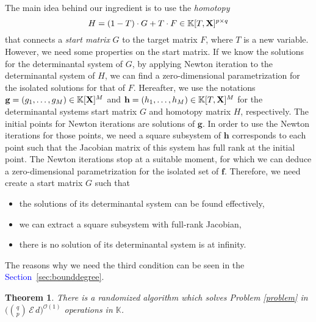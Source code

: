 \documentclass[11pt]{article}
\numberwithin{Property}{section}
\newtheorem{Theorem}{Theorem}%
\numberwithin{Theorem}{section}
\numberwithin{Proposition}{section}
\numberwithin{Lemma}{section}
\numberwithin{Corollary}{section}
\numberwithin{Definition}{section}
\numberwithin{Remark}{section}
\numberwithin{Conjecture}{section}
\numberwithin{Problem}{section}
\numberwithin{Claim}{section}
\theoremstyle{definition}
\numberwithin{Example}{section}
\def\f {\ensuremath{\mathbf{f}}}
\def\h {\ensuremath{\mathbf{h}}}
\def\g {\ensuremath{\mathbf{g}}}
\newcommand{\bigO}[1]{\mathcal{O}(#1)} %
\newcommand{\field}{\mathbb{K}} %
\newcommand{\mat}[1]{\mathbf{\MakeUppercase{#1}}} %
\newcommand{\improve}[1]{\textcolor{blue}{#1}} %
\begin{document}
The main idea behind our ingredient is to use the \emph{homotopy} 
\[H = (1-T)\cdot G + T\cdot F \in \field[T, \mat{X}]^{p \times q}\]
that connects a \emph{start matrix} $G$ to the target matrix $F$, where $T$ is a new variable. However, we need some properties on the start matrix. If we know the solutions for the determinantal system of $G$, by applying Newton iteration to the determinantal system of $H$, we can find a zero-dimensional parametrization for the isolated solutions for that of $F$. Hereafter, we use the notations $\g = (g_1, \ldots, g_M) \in \field[\mat{X}]^M$ and $\h = (h_1, \ldots, h_M) \in \field[T,\mat{X}]^M$ for the determinantal systems start matrix $G$ and homotopy matrix $H$, respectively. The initial points for Newton iterations are solutions of $\g$. In order to use the Newton iterations for those points, we need a square subsystem of $\h$ corresponds to each point such that the Jacobian matrix of this system has full rank at the initial point. The Newton iterations stop at a suitable moment, for which we can deduce a zero-dimensional parametrization for the isolated set of $\f$.  Therefore, we need create a start matrix $G$ such that
\begin{itemize}
\item the solutions of its determinantal system can be found effectively,
\item we can extract a square subsystem with full-rank Jacobian,
\item there is no solution of its determinantal system is at infinity.
\end{itemize}
The reasons why we need the third condition can be seen in the \improve{Section~\ref{sec:bounddegree}}. 

\begin{Theorem} There is a randomized algorithm which solves Problem \ref{problem} in $\big({{q}\choose{p}} \,\mathcal{E}\,d \big)^{\bigO{1}}$ operations in $\field$.
\end{Theorem}

\end{document}
